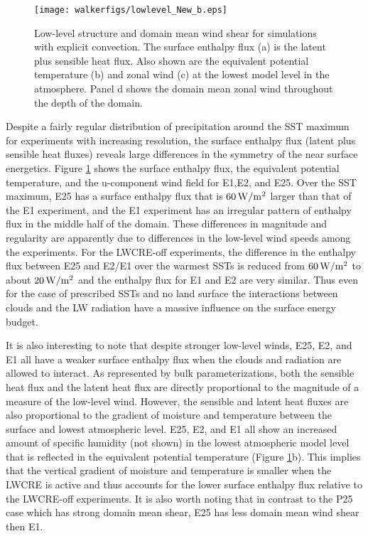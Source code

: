 \documentclass[draft]{agujournal2019}
\begin{document}
{\begin{figure}
  \centering       
    \texttt{[image: walkerfigs/lowlevel\_New\_b.eps]}
    \caption{Low-level structure and domain mean wind shear for simulations with explicit convection.  
    The surface enthalpy flux (a) is the latent plus sensible heat flux.  Also shown are the  
    equivalent potential temperature (b) and zonal wind (c) at the lowest model level in the atmosphere.  Panel 
    d shows the domain mean zonal wind throughout the depth of the domain.}
    \label{fig:enthalpy}
\end{figure}

Despite a fairly regular distribution of precipitation around the SST maximum for experiments with increasing resolution, the 
surface enthalpy flux (latent plus sensible heat fluxes) reveals large differences in the symmetry of the near surface energetics.   
Figure \ref{fig:enthalpy} shows the surface enthalpy flux, 
the equivalent potential temperature, and the u-component wind field for E1,E2, and E25.  
Over the SST maximum, E25 has a surface enthalpy flux that is $60 \, \rm{W/m^2}$ 
larger than that of the E1 experiment, and the E1 experiment has an irregular pattern of enthalpy flux in the middle
half of the domain.  These differences in magnitude and regularity are apparently due to differences in the low-level 
wind speeds among the experiments.  For the LWCRE-off experiments, the difference in the enthalpy flux between E25 and E2/E1 
over the warmest SSTs is reduced from $60 \, \rm{W/m^2}$ to about $20 \, \rm{W/m^2}$ and the enthalpy
flux for E1 and  E2 are very similar.   Thus even for the case of prescribed SSTs and no
land surface the interactions between clouds and the LW radiation have a massive influence on the 
surface energy budget.


It is also interesting to note that despite stronger low-level winds, E25, E2, and E1 all have a weaker surface
enthalpy flux when the clouds and radiation are allowed to interact.   As represented 
by bulk parameterizations, both the sensible heat flux and the latent heat flux are directly proportional to the 
magnitude of a measure of the low-level wind.  However, the sensible and latent heat fluxes are also 
proportional to the gradient of moisture and temperature between the surface and lowest atmospheric level.    
E25, E2, and E1 all show an increased amount of specific humidity (not shown) in the lowest atmospheric 
model level that is reflected in the equivalent potential temperature (Figure \ref{fig:enthalpy}b).  This 
implies that the vertical gradient of moisture and temperature is smaller when the LWCRE is active and thus accounts 
for the lower surface enthalpy flux relative to the LWCRE-off experiments.         
It is also worth noting that in contrast to the P25 case which has strong domain mean shear, E25 has less domain 
mean wind shear then E1.  


}
\end{document}
